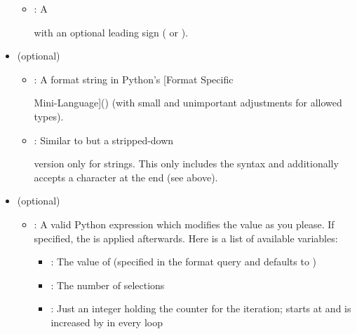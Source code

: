 \documentclass[letterpaper,12pt,english]{sphinxmanual}
\begin{document}
\begin{itemize}
\begin{itemize}
\item {} 
: A


with an optional leading sign (\sphinxcode{\sphinxupquote{-}} or \sphinxcode{\sphinxupquote{+}}).

\end{itemize}

\item {} 
 (optional)
\begin{itemize}
\item {} 
: A format string in Python’s {[}Format Specific

Mini-Language{]}()
(with small and unimportant adjustments for allowed types).

\item {} 
: Similar to  but a stripped-down

version only for strings. This only includes the
\sphinxcode{\sphinxupquote{{[}{[}fill{]}align{]}{[}width{]}}} syntax and additionally accepts a 
character at the end (see above).

\end{itemize}

\item {} 
 (optional)
\begin{itemize}
\item {} 
: A valid Python expression which modifies the value
as you please. If specified, the  is applied
afterwards. Here is a list of available variables:
\begin{itemize}
\item {} 
: The value of  (specified in the format query and
defaults to )

\item {} 
: The number of selections

\item {} 
: Just an integer holding the counter for the iteration;
starts at  and is increased by  in every loop


\end{itemize}
\end{itemize}
\end{itemize}
\end{document}
